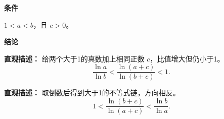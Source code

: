 \begin{statementbox}

	\textbf{\textcolor{CStatement}{条件}}
	\begin{description}[style=nextline, leftmargin=2.8em, labelsep=0.5em, itemsep=0.35em]
		\item[\textbf{\textcolor{CStatement}{条件 1（真数大于1）：}}] $1<a<b$，且 $c>0$。
	\end{description}

	\textbf{\textcolor{CStatement}{结论}}
	\begin{description}[style=nextline, leftmargin=2.8em, labelsep=0.5em, itemsep=0.45em]
		\item[\textbf{\textcolor{CStatement}{结论一（对数糖水不等式）：}}]
			\textbf{\textcolor{CStatement}{直观描述：}}
			给两个大于1的真数加上相同正数 $c$，比值增大但仍小于1。
			\[
				\frac{\ln a}{\ln b} < \frac{\ln(a+c)}{\ln(b+c)} < 1.
			\]

		\item[\textbf{\textcolor{CStatement}{常见变形（取倒数形式）：}}]
			\textbf{\textcolor{CStatement}{直观描述：}}
			取倒数后得到大于1的不等式链，方向相反。
			\[
				1 < \frac{\ln(b+c)}{\ln(a+c)} < \frac{\ln b}{\ln a}.
			\]
	\end{description}
\end{statementbox}
